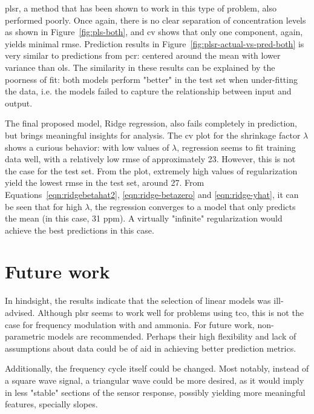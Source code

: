 \acrshort{plsr}, a method that has been shown to work in this type of problem, also performed poorly. Once again, there is no clear separation of concentration levels as shown in Figure~\ref{fig:pls-both}, and \acrshort{cv} shows that only one component, again, yields minimal \acrshort{rmse}. Prediction results in Figure~\ref{fig:plsr-actual-vs-pred-both} is very similar to predictions from \acrshort{pcr}: centered around the mean with lower variance than \acrshort{ols}. The similarity in these results can be explained by the poorness of fit: both models perform "better" in the test set when under-fitting the data, i.e. the models failed to capture the relationship between input and output.

The final proposed model, Ridge regression, also fails completely in prediction, but brings meaningful insights for analysis. The \acrshort{cv} plot for the shrinkage factor $\lambda$ shows a curious behavior: with low values of $\lambda$, regression seems to fit training data well, with a relatively low \acrshort{rmse} of approximately 23. However, this is not the case for the test set. From the plot, extremely high values of regularization yield the lowest \acrshort{rmse} in the test set, around 27. From Equations~\ref{eqn:ridgebetahat2}, \ref{eqn:ridge-betazero} and \ref{eqn:ridge-yhat}, it can be seen that for high $\lambda$, the regression converges to a model that only predicts the mean (in this case, 31 ppm). A virtually "infinite" regularization would achieve the best predictions in this case.

\section{Future work}
\label{sec:discussion-method}

In hindsight, the results indicate that the selection of linear models was ill-advised. Although \acrshort{plsr} seems to work well for problems using \acrshort{tco}, this is not the case for frequency modulation with \nox and ammonia. For future work, non-parametric models are recommended. Perhaps their high flexibility and lack of assumptions about data could be of aid in achieving better prediction metrics.

Additionally, the frequency cycle itself could be changed. Most notably, instead of a square wave signal, a triangular wave could be more desired, as it would imply in less "stable" sections of the sensor response, possibly yielding more meaningful features, specially slopes.

